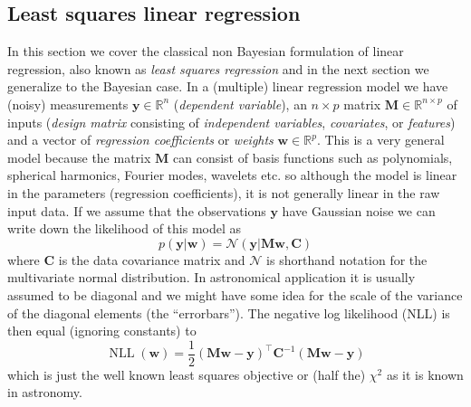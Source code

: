 \documentclass[12pt,dvipsnames]{report}
\renewcommand{\vec}[1]{\boldsymbol{\mathbf{#1}}}
\begin{document}
\subsection{Least squares linear regression}
\label{ssec:least_squares}
In this section we cover the classical non Bayesian formulation of linear
regression, also known as \emph{least squares regression} and in the next
section we generalize to the Bayesian case. In a (multiple) linear regression
model we have (noisy) measurements $\vec{y}\in \mathbb{R}^n$ (\emph{dependent
    variable}), an $n\times p$ matrix $\vec{M}\in \mathbb{R}^{n\times p}$ of inputs
(\emph{design matrix} consisting of \emph{independent variables},
\emph{covariates}, or \emph{features}) and a vector of \emph{regression
    coefficients} or \emph{weights} $\vec{w}\in \mathbb{R}^p$. This is a very
general model because the matrix $\vec{M}$ can consist of basis functions such
as polynomials, spherical harmonics, Fourier modes, wavelets etc. so although
the model is linear in the parameters (regression coefficients), it is not
generally linear in the raw input data. If we assume that the observations
$\vec{y}$ have Gaussian noise we can write down the likelihood of this model as
\begin{equation}
    p(\vec{y}\lvert \vec{w})=\mathcal{N}(\vec{y}\lvert\vec{M}\vec{w}, \vec{C})
\end{equation}
where $\vec{C}$ is the data covariance matrix and $\mathcal{N}$ is shorthand notation for
the multivariate normal distribution. In astronomical application it is usually
assumed to be diagonal and we might have some idea for the scale of the variance
of the diagonal elements (the ``errorbars'').
The negative log likelihood (NLL) is then equal (ignoring constants)  to
\begin{equation}
    \operatorname{NLL}(\vec{w})=\frac{1}{2}(\vec{M} \vec{w}-\vec{y})^{\intercal}\vec{C}^{-1}(\vec{M} \vec{w}-\vec{y})
\end{equation}
which is just the well known least squares objective or (half the) $\chi^2$ as it is known
in astronomy.
\end{document}
